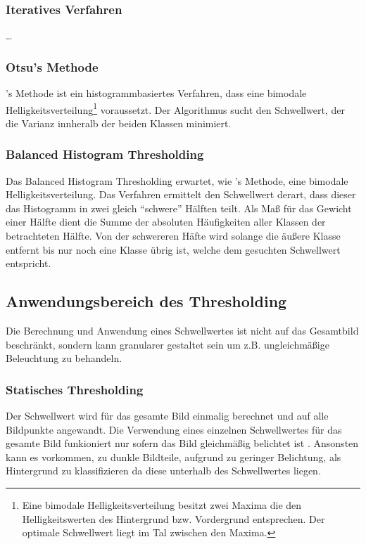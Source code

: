\subsubsection*{Iteratives Verfahren}
\ldots
{}

\subsubsection*{Otsu's Methode}
's Methode \cite{otsu1979} ist ein histogrammbasiertes Verfahren, dass eine bimodale Helligkeitsverteilung\footnote{Eine bimodale Helligkeitsverteilung besitzt zwei Maxima die den Helligkeitswerten des Hintergrund bzw. Vordergrund entsprechen. Der optimale Schwellwert liegt im Tal zwischen den Maxima.} voraussetzt.
Der Algorithmus sucht den Schwellwert, der die Varianz innheralb der beiden Klassen minimiert.

\subsubsection*{Balanced Histogram Thresholding}
Das Balanced Histogram Thresholding \cite{DBLP:conf/biostec/AnjosS08} erwartet, wie 's Methode, eine bimodale Helligkeitsverteilung.
Das Verfahren ermittelt den Schwellwert derart, dass dieser das Histogramm in zwei gleich "`schwere"' Hälften teilt.
Als Maß für das Gewicht einer Hälfte dient die Summe der absoluten Häufigkeiten aller Klassen der betrachteten Hälfte.
Von der schwereren Häfte wird solange die äußere Klasse entfernt bis nur noch eine Klasse übrig ist, welche dem gesuchten Schwellwert entspricht.

\subsection*{Anwendungsbereich des Thresholding}
Die Berechnung und Anwendung eines Schwellwertes ist nicht auf das Gesamtbild beschränkt, sondern kann granularer gestaltet sein um z.B. ungleichmäßige Beleuchtung zu behandeln.

\subsubsection*{Statisches Thresholding}
Der Schwellwert wird für das gesamte Bild einmalig berechnet und auf alle Bildpunkte angewandt.
Die Verwendung eines einzelnen Schwellwertes für das gesamte Bild funkioniert nur sofern das Bild gleichmäßig belichtet ist \cite[Kap.~4.3]{davies2012}.
Ansonsten kann es vorkommen, zu dunkle Bildteile, aufgrund zu geringer Belichtung, als Hintergrund zu klassifizieren da diese unterhalb des Schwellwertes liegen.

